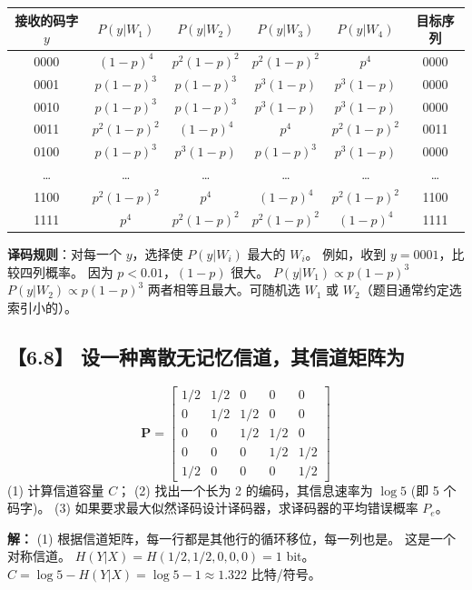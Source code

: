 \documentclass[11pt, a4paper]{article}
\begin{document}
\begin{table}[h]
\centering
\footnotesize
\begin{tabular}{|c|c|c|c|c|c|}
\hline
接收的码字 $y$ & $P(y|W_1)$ & $P(y|W_2)$ & $P(y|W_3)$ & $P(y|W_4)$ & 目标序列 \\
\hline
0000 & $(1-p)^4$ & $p^2(1-p)^2$ & $p^2(1-p)^2$ & $p^4$ & 0000 \\
0001 & $p(1-p)^3$ & $p(1-p)^3$ & $p^3(1-p)$ & $p^3(1-p)$ & 0000 \\
0010 & $p(1-p)^3$ & $p(1-p)^3$ & $p^3(1-p)$ & $p^3(1-p)$ & 0000 \\
0011 & $p^2(1-p)^2$ & $(1-p)^4$ & $p^4$ & $p^2(1-p)^2$ & 0011 \\
0100 & $p(1-p)^3$ & $p^3(1-p)$ & $p(1-p)^3$ & $p^3(1-p)$ & 0000 \\
\dots & \dots & \dots & \dots & \dots & \dots \\
1100 & $p^2(1-p)^2$ & $p^4$ & $(1-p)^4$ & $p^2(1-p)^2$ & 1100 \\
1111 & $p^4$ & $p^2(1-p)^2$ & $p^2(1-p)^2$ & $(1-p)^4$ & 1111 \\
\hline
\end{tabular}
\end{table}

\textbf{译码规则}：对每一个 $y$，选择使 $P(y|W_i)$ 最大的 $W_i$。
例如，收到 $y=0001$，比较四列概率。
因为 $p < 0.01$，$(1-p)$ 很大。
$P(y|W_1) \propto p(1-p)^3$
$P(y|W_2) \propto p(1-p)^3$
两者相等且最大。可随机选 $W_1$ 或 $W_2$（题目通常约定选索引小的）。

\subsection*{【6.8】 设一种离散无记忆信道，其信道矩阵为}
\[
\mathbf{P} = \begin{bmatrix}
1/2 & 1/2 & 0 & 0 & 0 \\
0 & 1/2 & 1/2 & 0 & 0 \\
0 & 0 & 1/2 & 1/2 & 0 \\
0 & 0 & 0 & 1/2 & 1/2 \\
1/2 & 0 & 0 & 0 & 1/2
\end{bmatrix}
\]
(1) 计算信道容量 $C$；
(2) 找出一个长为 2 的编码，其信息速率为 $\log 5$ (即 5 个码字)。
(3) 如果要求最大似然译码设计译码器，求译码器的平均错误概率 $P_e$。

\textbf{解：}
(1) 根据信道矩阵，每一行都是其他行的循环移位，每一列也是。
这是一个对称信道。
$H(Y|X) = H(1/2, 1/2, 0, 0, 0) = 1$ bit。
$C = \log 5 - H(Y|X) = \log 5 - 1 \approx 1.322$ 比特/符号。
\end{document}
